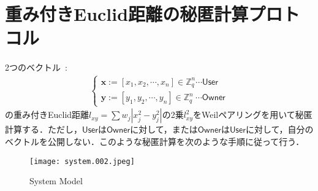 \documentclass[a4paper]{jsarticle}
\begin{document}
\section{重み付きEuclid距離の秘匿計算プロトコル}
2つのベクトル\ :\ 
\begin{align}
\begin{cases}
\bm{x}:=[x_1, x_2, \cdots, x_n]\in \mathbb{Z}^n_q \cdots \mathsf{User}\\
\bm{y}:=[y_1, y_2, \cdots, y_n]\in \mathbb{Z}^n_q \ \cdots \mathsf{Owner}
\end{cases}
\end{align}
の重み付きEuclid距離$l_{xy}=\sum w_j|x^2_j - y^2_j|$の2乗$l_{xy}^2$をWeilペアリングを用いて秘匿計算する．ただし，$\mathsf{User}$は$\mathsf{Owner}$に対して，または$\mathsf{Owner}$は$\mathsf{User}$に対して，自分のベクトルを公開しない．このような秘匿計算を次のような手順に従って行う．
\begin{figure}[!h]
  \begin{center}
   \texttt{[image: system.002.jpeg]}
  \end{center}
  \caption{System Model}
  \label{SM1} %
\end{figure}
\end{document}

